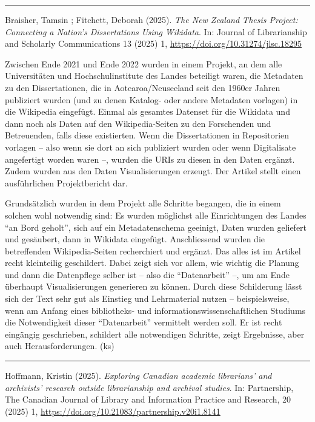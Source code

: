 \documentclass[a4paper,
fontsize=11pt,
oneside,
numbers=noperiodatend,
parskip=half-,
bibliography=totoc,
final
]{scrartcl}
\begin{document}
\begin{center}\rule{0.5\linewidth}{0.5pt}\end{center}

Braisher, Tamsin ; Fitchett, Deborah (2025). \emph{The New Zealand
Thesis Project: Connecting a Nation's Dissertations Using Wikidata}. In:
Journal of Librarianship and Scholarly Communications 13 (2025) 1,
\url{https://doi.org/10.31274/jlsc.18295}

Zwischen Ende 2021 und Ende 2022 wurden in einem Projekt, an dem alle
Universitäten und Hochschulinstitute des Landes beteiligt waren, die
Metadaten zu den Dissertationen, die in Aotearoa/Neuseeland seit den
1960er Jahren publiziert wurden (und zu denen Katalog- oder andere
Metadaten vorlagen) in die Wikipedia eingefügt. Einmal als gesamtes
Datenset für die Wikidata und dann noch als Daten auf den
Wikipedia-Seiten zu den Forschenden und Betreuenden, falls diese
existierten. Wenn die Dissertationen in Repositorien vorlagen -- also
wenn sie dort an sich publiziert wurden oder wenn Digitalisate
angefertigt worden waren --, wurden die URIs zu diesen in den Daten
ergänzt. Zudem wurden aus den Daten Visualisierungen erzeugt. Der
Artikel stellt einen ausführlichen Projektbericht dar.

Grundsätzlich wurden in dem Projekt alle Schritte begangen, die in einem
solchen wohl notwendig sind: Es wurden möglichst alle Einrichtungen des
Landes \enquote{an Bord geholt}, sich auf ein Metadatenschema geeinigt,
Daten wurden geliefert und gesäubert, dann in Wikidata eingefügt.
Anschliessend wurden die betreffenden Wikipedia-Seiten recherchiert und
ergänzt. Das alles ist im Artikel recht kleinteilig geschildert. Dabei
zeigt sich vor allem, wie wichtig die Planung und dann die Datenpflege
selber ist -- also die \enquote{Datenarbeit} --, um am Ende überhaupt
Visualisierungen generieren zu können. Durch diese Schilderung lässt
sich der Text sehr gut als Einstieg und Lehrmaterial nutzen --
beispielsweise, wenn am Anfang eines bibliotheks- und
informationswissenschaftlichen Studiums die Notwendigkeit dieser
\enquote{Datenarbeit} vermittelt werden soll. Er ist recht eingängig
geschrieben, schildert alle notwendigen Schritte, zeigt Ergebnisse, aber
auch Herausforderungen. (ks)

\begin{center}\rule{0.5\linewidth}{0.5pt}\end{center}

Hoffmann, Kristin (2025). \emph{Exploring Canadian academic librarians'
and archivists' research outside librarianship and archival studies}.
In: Partnership, The Canadian Journal of Library and Information
Practice and Research, 20 (2025) 1,
\url{https://doi.org/10.21083/partnership.v20i1.8141}
\end{document}
